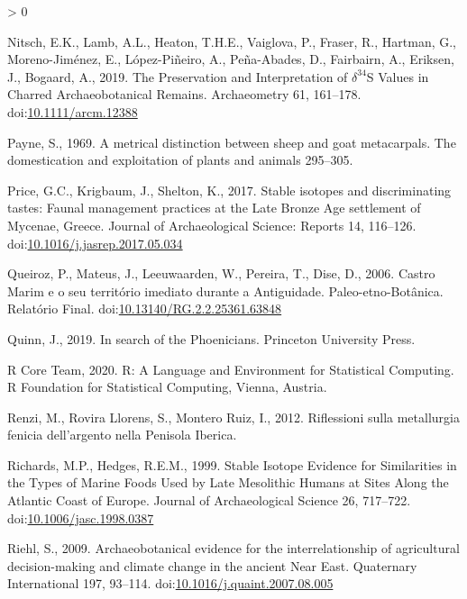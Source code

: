 \documentclass[5p]{elsarticle} %
\newlength{\cslhangindent}
\newenvironment{CSLReferences}[2] %
 {%
  \setlength{\parindent}{0pt}
  \ifodd #1 \everypar{\setlength{\hangindent}{\cslhangindent}}\ignorespaces\fi
  \ifnum #2 > 0
  \setlength{\parskip}{#2\baselineskip}
  \fi
 }%
 {}
\begin{document}
\begin{CSLReferences}{1}{0}
\leavevmode\hypertarget{ref-nitsch_etal19}{}%
Nitsch, E.K., Lamb, A.L., Heaton, T.H.E., Vaiglova, P., Fraser, R., Hartman, G., Moreno-Jiménez, E., López-Piñeiro, A., Peña-Abades, D., Fairbairn, A., Eriksen, J., Bogaard, A., 2019. The {Preservation} and {Interpretation} of {\(\delta^{34}\)S Values} in {Charred Archaeobotanical Remains}. Archaeometry 61, 161--178. doi:\href{https://doi.org/10.1111/arcm.12388}{10.1111/arcm.12388}

\leavevmode\hypertarget{ref-payne69}{}%
Payne, S., 1969. A metrical distinction between sheep and goat metacarpals. The domestication and exploitation of plants and animals 295--305.

\leavevmode\hypertarget{ref-price_etal17}{}%
Price, G.C., Krigbaum, J., Shelton, K., 2017. Stable isotopes and discriminating tastes: {Faunal} management practices at the {Late Bronze Age} settlement of {Mycenae}, {Greece}. Journal of Archaeological Science: Reports 14, 116--126. doi:\href{https://doi.org/10.1016/j.jasrep.2017.05.034}{10.1016/j.jasrep.2017.05.034}

\leavevmode\hypertarget{ref-queiroz_etal06}{}%
Queiroz, P., Mateus, J., Leeuwaarden, W., Pereira, T., Dise, D., 2006. Castro {Marim} e o seu território imediato durante a {Antiguidade}. {Paleo}-etno-{Botânica}. {Relatório Final}. doi:\href{https://doi.org/10.13140/RG.2.2.25361.63848}{10.13140/RG.2.2.25361.63848}

\leavevmode\hypertarget{ref-quinn19}{}%
Quinn, J., 2019. In search of the {Phoenicians}. {Princeton University Press}.

\leavevmode\hypertarget{ref-rcoreteam20}{}%
R Core Team, 2020. R: {A Language} and {Environment} for {Statistical Computing}. {R Foundation for Statistical Computing}, {Vienna, Austria}.

\leavevmode\hypertarget{ref-renzi_etal12}{}%
Renzi, M., Rovira Llorens, S., Montero Ruiz, I., 2012. Riflessioni sulla metallurgia fenicia dell'argento nella {Penisola Iberica}.

\leavevmode\hypertarget{ref-richards_hedges99}{}%
Richards, M.P., Hedges, R.E.M., 1999. Stable {Isotope Evidence} for {Similarities} in the {Types} of {Marine Foods Used} by {Late Mesolithic Humans} at {Sites Along} the {Atlantic Coast} of {Europe}. Journal of Archaeological Science 26, 717--722. doi:\href{https://doi.org/10.1006/jasc.1998.0387}{10.1006/jasc.1998.0387}

\leavevmode\hypertarget{ref-riehl09}{}%
Riehl, S., 2009. Archaeobotanical evidence for the interrelationship of agricultural decision-making and climate change in the ancient {Near East}. Quaternary International 197, 93--114. doi:\href{https://doi.org/10.1016/j.quaint.2007.08.005}{10.1016/j.quaint.2007.08.005}


\end{CSLReferences}
\end{document}
